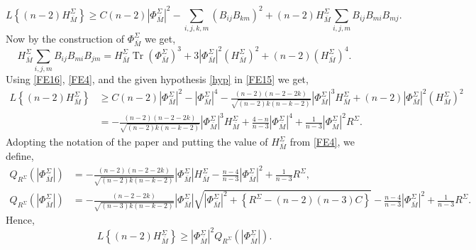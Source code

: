 \documentclass[11pt]{amsart}
\DeclareMathOperator{\Tr}{Tr}
\numberwithin{equation}{section}
\begin{document}
\begin{equation}\label{FE15}
    L\left\{(n-2)H^{\Sigma}_{\overline{M}}\right\}\ge C(n-2)\left|\Phi^{\Sigma}_{\overline{M}}\right|^2-\sum_{i, j, k, m} (B_{ij} B_{km})^2+(n-2)H^{\Sigma}_{\overline{M}} \sum_{i, j, m} B_{ij} B_{mi} B_{mj}.
\end{equation}
Now by the construction of $\Phi^{\Sigma}_{\overline{M}}$ we get,
\begin{equation}\label{FE16}
    H^{\Sigma}_{\overline{M}} \sum_{i, j, m} B_{ij} B_{mi} B_{jm}=H^{\Sigma}_{\overline{M}} \Tr\left(\Phi^{\Sigma}_{\overline{M}}\right)^3+3 \left|\Phi^{\Sigma}_{\overline{M}}\right|^2(H^{\Sigma}_{\overline{M}})^2+(n-2)\left(H^{\Sigma}_{\overline{M}}\right)^4.
\end{equation}
 Using \eqref{FE16}, \eqref{FE4}, and the given hypothesis \ref{hyp} in \eqref{FE15} we get,
 \begin{align}\label{FE17}
     L\left\{(n-2)H^{\Sigma}_{\overline{M}}\right\}&\ge C(n-2)\left|\Phi^{\Sigma}_{\overline{M}}\right|^2-\left|\Phi^{\Sigma}_{\overline{M}}\right|^4-\frac{(n-2)(n-2-2k)}{\sqrt{(n-2)k(n-k-2)}}\left|\Phi^{\Sigma}_{\overline{M}}\right|^3H^{\Sigma}_{\overline{M}}+ (n-2) \left|\Phi^{\Sigma}_{\overline{M}}\right|^2 \left(H^{\Sigma}_{\overline{M}}\right)^2 \nonumber\\
     &= -\frac{(n-2)(n-2-2k)}{\sqrt{(n-2)k(n-k-2)}}\left|\Phi^{\Sigma}_{\overline{M}}\right|^3H^{\Sigma}_{\overline{M}}+\frac{4-n}{n-3}\left|\Phi^{\Sigma}_{\overline{M}}\right|^4+\frac{1}{n-3} \left|\Phi^{\Sigma}_{\overline{M}}\right|^2R^{\Sigma}.
 \end{align}
Adopting the notation of the paper \cite{AMP} and putting the value of $H^{\Sigma}_{\overline{M}}$ from \eqref{FE4}, we define,
\begin{align}
    Q_{R^{\Sigma}}\left(\left|\Phi^{\Sigma}_{\overline{M}}\right|\right)&= -\frac{(n-2)(n-2-2k)}{\sqrt{(n-2)k(n-k-2)}}\left|\Phi^{\Sigma}_{\overline{M}}\right|H^{\Sigma}_{\overline{M}}-\frac{n-4}{n-3}\left|\Phi^{\Sigma}_{\overline{M}}\right|^2+\frac{1}{n-3}R^{\Sigma},\nonumber\\
    Q_{R^{\Sigma}}\left(\left|\Phi^{\Sigma}_{\overline{M}}\right|\right)&= -\frac{(n-2-2k)}{\sqrt{(n-3)k(n-k-2)}}\left|\Phi^{\Sigma}_{\overline{M}}\right| \sqrt{\left|\Phi^{\Sigma}_{\overline{M}}\right|^2+\left\{R^{\Sigma}-(n-2)(n-3)C\right\}}-\frac{n-4}{n-3}\left|\Phi^{\Sigma}_{\overline{M}}\right|^2+\frac{1}{n-3}R^{\Sigma}.
\end{align}
Hence,
\begin{equation}\label{FE28}
     L\left\{(n-2)H^{\Sigma}_{\overline{M}}\right\}\ge \left|\Phi^{\Sigma}_{\overline{M}}\right|^2 Q_{R^{\Sigma}}\left(\left|\Phi^{\Sigma}_{\overline{M}}\right|\right).
\end{equation}
\end{document}
